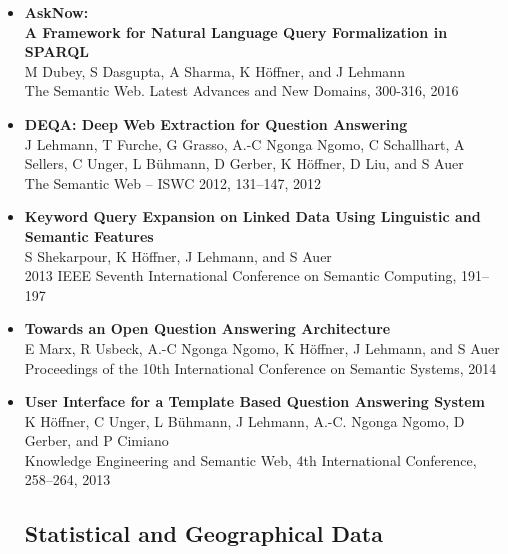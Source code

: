 \begin{itemize}
\item \textbf{AskNow:}\\
\textbf{A Framework for Natural Language Query Formalization in SPARQL}~\citep{eswc_asknow}\\
M Dubey, S Dasgupta, A Sharma, K Höffner, and J Lehmann\\
The Semantic Web. Latest Advances and New Domains, 300-316, 2016

\item \textbf{{DEQA}: {D}eep Web Extraction for {Q}uestion {A}nswering}~\citep{LEH+12b}\\
J Lehmann, T Furche, G Grasso, A.-C Ngonga Ngomo, C Schallhart, A Sellers, C Unger, L Bühmann, D Gerber, K Höffner, D Liu, and S Auer\\
The Semantic Web -- ISWC 2012, 131--147, 2012

\item \textbf{Keyword Query Expansion on Linked Data Using Linguistic and Semantic Features}~\citep{ICSC2013Expansion}\\
S Shekarpour, K Höffner, J Lehmann, and S Auer\\
2013 IEEE Seventh International Conference on Semantic Computing, 191–197%

\item \textbf{Towards an Open Question Answering Architecture}~\citep{openQA}\\
E Marx, R Usbeck, A.-C Ngonga Ngomo, K Höffner, J Lehmann, and S Auer\\
Proceedings of the 10th International Conference on Semantic Systems, 2014

\item \textbf{User Interface for a Template Based Question Answering System}~\citep{hoeffner-2013-kesw}\\
K Höffner, C Unger, L Bühmann, J Lehmann, A.-C. Ngonga Ngomo, D Gerber, and P Cimiano\\
Knowledge Engineering and Semantic Web, 4th International Conference, 258--264, 2013

\subsection*{Statistical and Geographical Data}


\end{itemize}
